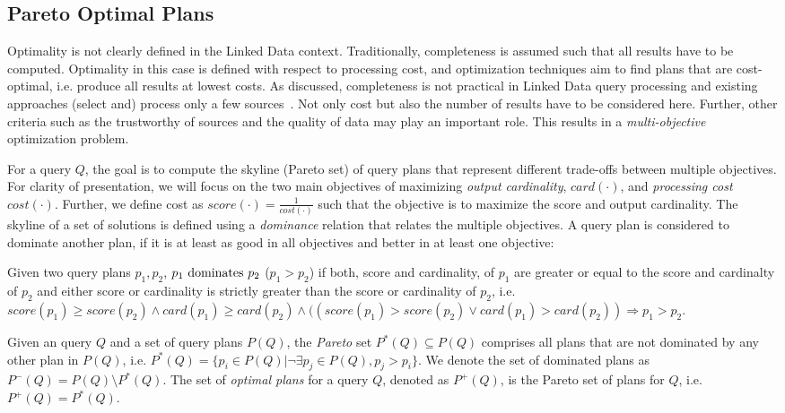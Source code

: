 \subsection{Pareto Optimal Plans} 
Optimality is not clearly defined in the Linked Data context. Traditionally, completeness is assumed such that all results have to be computed. Optimality in this case is defined with respect to processing cost, and optimization techniques aim to find plans that are cost-optimal, i.e. produce all results at lowest costs. As discussed, completeness is not practical in Linked Data query processing and existing approaches (select and) process only a few sources~\cite{harth_data_2010,ladwig_linked_2010}. Not only cost but also the number of results have to be considered here. Further, other criteria such as the trustworthy of sources and the quality of data may play an important role. This results in a \emph{multi-objective} optimization problem. 

For a query $Q$, %
the goal is to compute the skyline (Pareto set) of query plans that represent different trade-offs between multiple objectives. For clarity of presentation, we will focus on the two main objectives of maximizing \emph{output cardinality}, $card(\cdot)$, and \emph{processing cost} $cost(\cdot)$. Further, we define cost as $score(\cdot) = \frac{1}{cost(\cdot)}$ such that the objective is to maximize the score and output cardinality.  
The skyline of a set of solutions is defined using a \emph{dominance}
relation that relates the multiple objectives. A query plan is considered to dominate another plan, if it is at least as good in all objectives and better in at least one objective:

\begin{definition}[Dominance]
  Given two query plans $p_1,p_2$, $p_1 \mbox{ \textnormal{dominates}
  } p_2$ ($p_1 > p_2$) if both, score and cardinality, of $p_1$ are greater or equal
  to the score and cardinalty of $p_2$ and either score or
  cardinality is strictly greater than the score or cardinality of
  $p_2$, i.e. $score(p_1) \geq score(p_2) \wedge card(p_1) \geq
  card(p_2) \wedge ((score(p_1) > score(p_2) \vee card(p_1) >
  card(p_2)) \Rightarrow p_1 > p_2$.
\end{definition}


\begin{definition}
  Given an query $Q$ and a set of query plans $P(Q)$, the \emph{Pareto}
  set $P^*(Q) \subseteq P(Q)$ comprises all plans that are not
  dominated by any other plan in $P(Q)$, i.e. $P^*(Q) = \{p_i \in P(Q) | \neg\exists p_j\in P(Q), p_j  > p_i\}$. We denote the set of
  dominated plans as $P^-(Q) = P(Q) \setminus P^*(Q)$. The set of \emph{optimal plans} for a query $Q$, denoted as $P^+(Q)$, is the Pareto set of plans for $Q$, i.e. $P^+(Q) = P^*(Q)$.
\end{definition}


